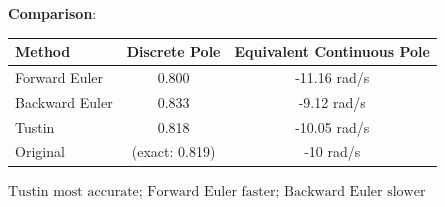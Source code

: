 \begin{example}
\textbf{Comparison}:

\begin{center}
\begin{tabular}{lcc}
\toprule
\textbf{Method} & \textbf{Discrete Pole} & \textbf{Equivalent Continuous Pole} \\
\midrule
Forward Euler & 0.800 & -11.16 rad/s \\
Backward Euler & 0.833 & -9.12 rad/s \\
Tustin & 0.818 & -10.05 rad/s \\
\midrule
Original & (exact: 0.819) & -10 rad/s \\
\bottomrule
\end{tabular}
\end{center}

$\boxed{\text{Tustin most accurate; Forward Euler faster; Backward Euler slower}}$
\end{example}

